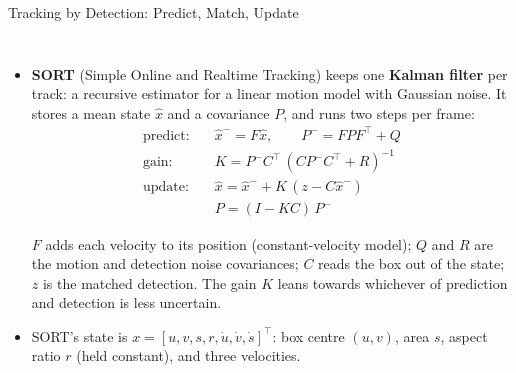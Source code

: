 \begin{frame}{Tracking by Detection: Predict, Match, Update}
  \begin{columns}[T,onlytextwidth]
      \begin{itemize}\footnotesize\itemsep0.3em
        \item \textbf{SORT} (Simple Online and Realtime Tracking) keeps one \textbf{Kalman filter} per track: a recursive estimator for a linear motion model with Gaussian noise. It stores a mean state $\hat{x}$ and a covariance $P$, and runs two steps per frame:
        \[ \begin{aligned}
          \text{predict:}\quad & \hat{x}^- = F\hat{x}, \qquad P^- = FPF^\top + Q\\
          \text{gain:}\quad & K = P^-C^\top\,(CP^-C^\top + R)^{-1}\\
          \text{update:}\quad & \hat{x} = \hat{x}^- + K\,(z - C\hat{x}^-)\\
          & P = (I - KC)\,P^-
        \end{aligned} \]
        {\scriptsize $F$ adds each velocity to its position (constant-velocity model); $Q$ and $R$ are the motion and detection noise covariances; $C$ reads the box out of the state; $z$ is the matched detection. The gain $K$ leans towards whichever of prediction and detection is less uncertain.\par}
        \item SORT's state is $x = [u, v, s, r, \dot{u}, \dot{v}, \dot{s}]^\top$: box centre $(u, v)$, area $s$, aspect ratio $r$ (held constant), and three velocities.
      \end{itemize}
      {\centering
      }
\end{columns}
\end{frame}
